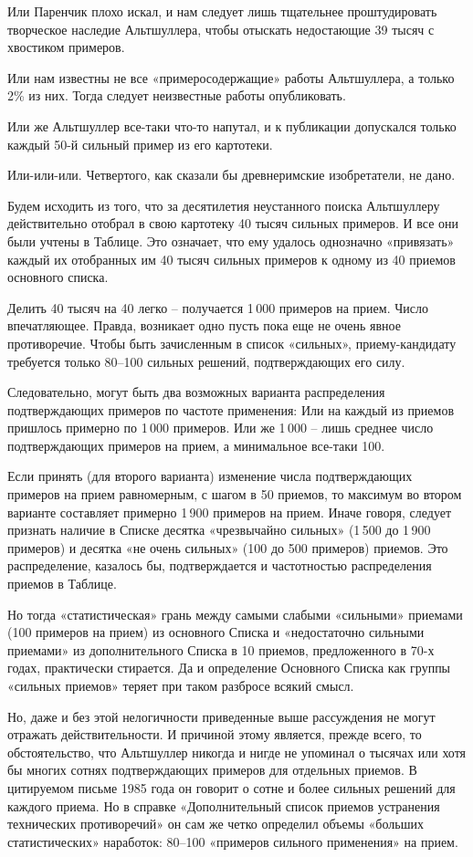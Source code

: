 \documentclass[11pt,a4paper]{article}
\begin{document}
Или Паренчик плохо искал, и нам следует лишь тщательнее проштудировать
творческое наследие Альтшуллера, чтобы отыскать недостающие 39 тысяч с
хвостиком примеров.

Или нам известны не все «примеросодержащие» работы Альтшуллера, а только 2\%
из них. Тогда следует неизвестные работы опубликовать.

Или же Альтшуллер все-таки что-то напутал, и к публикации допускался только
каждый 50-й сильный пример из его картотеки.

Или-или-или. Четвертого, как сказали бы древнеримские изобретатели, не дано.

Будем исходить из того, что за десятилетия неустанного поиска Альтшуллеру
действительно отобрал в свою картотеку 40 тысяч сильных примеров. И все они
были учтены в Таблице. Это означает, что ему удалось однозначно «привязать»
каждый их отобранных им 40 тысяч сильных примеров к одному из 40 приемов
основного списка.

Делить 40 тысяч на 40 легко -- получается 1\,000 примеров на прием. Число
впечатляющее. Правда, возникает одно пусть пока еще не очень явное
противоречие. Чтобы быть зачисленным в список «сильных», приему-кандидату
требуется только 80--100 сильных решений, подтверждающих его силу.

Следовательно, могут быть два возможных варианта распределения подтверждающих
примеров по частоте применения: Или на каждый из приемов пришлось примерно по
1\,000 примеров. Или же 1\,000 -- лишь среднее число подтверждающих примеров
на прием, а минимальное все-таки 100.

Если принять (для второго варианта) изменение числа подтверждающих примеров на
прием равномерным, с шагом в 50 приемов, то максимум во втором варианте
составляет примерно 1\,900 примеров на прием. Иначе говоря, следует признать
наличие в Списке десятка «чрезвычайно сильных» (1\,500 до 1\,900 примеров) и
десятка «не очень сильных» (100 до 500 примеров) приемов. Это распределение,
казалось бы, подтверждается и частотностью распределения приемов в Таблице.

Но тогда «статистическая» грань между самыми слабыми «сильными» приемами (100
примеров на прием) из основного Списка и «недостаточно сильными приемами» из
дополнительного Списка в 10 приемов, предложенного в 70-х годах, практически
стирается. Да и определение Основного Списка как группы «сильных приемов»
теряет при таком разбросе всякий смысл.

Но, даже и без этой нелогичности приведенные выше рассуждения не могут
отражать действительности. И причиной этому является, прежде всего, то
обстоятельство, что Альтшуллер никогда и нигде не упоминал о тысячах или хотя
бы многих сотнях подтверждающих примеров для отдельных приемов. В цитируемом
письме 1985 года он говорит о сотне и более сильных решений для каждого
приема. Но в справке «Дополнительный список приемов устранения технических
противоречий» он сам же четко определил объемы «больших статистических»
наработок: 80--100 «примеров сильного применения» на прием.
\end{document}
